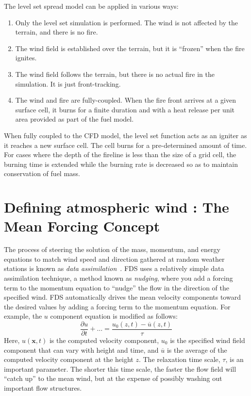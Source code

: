 \documentclass[journal,article,atmosphere,submit,moreauthors,pdftex]{Definitions/mdpi}
\begin{document}
The level set spread model can be applied in various ways:
\begin{enumerate}
\item Only the level set simulation is performed. The wind is not affected by the terrain, and there is no fire.
\item The wind field is established over the terrain, but it is ``frozen'' when the fire ignites.
\item The wind field follows the terrain, but there is no actual fire in the simulation. It is just front-tracking.
\item The wind and fire are fully-coupled. When the fire front arrives at a given surface cell, it burns for a finite duration and with a heat release per unit area provided as part of the fuel model.
\end{enumerate}
When fully coupled to the CFD model, the level set function acts as an igniter as it reaches a new surface cell. The cell burns for a pre-determined amount of time. For cases where the depth of the fireline is less than the size of a grid cell, the burning time is extended while the burning rate is decreased so as to maintain conservation of fuel mass.











\section{Defining atmospheric wind : The Mean Forcing Concept} \label{sec:wind}

The process of steering the solution of the mass, momentum, and energy equations to match wind speed and direction gathered at random weather stations is known as \emph{data assimilation}~\cite{Kalnay:2003}. FDS uses a relatively simple data assimilation technique, a method known as \emph{nudging}, where you add a forcing term to the momentum equation to ``nudge'' the flow in the direction of the specified wind. FDS automatically drives the mean velocity components toward the desired values by adding a forcing term to the momentum equation. For example, the $u$ component equation is modified as follows:
\begin{equation}
   \frac{\partial u}{\partial t} + \ldots = \frac{u_0(z,t)-\overline{u}(z,t)}{\tau} \label{mean_forcing_u}
\end{equation}
Here, $u(\mathbf{x},t)$ is the computed velocity component, $u_0$ is the specified wind field component that can vary with height and time, and $\overline{u}$ is the average of the computed velocity component at the height $z$. The relaxation time scale, $\tau$, is an important parameter. The shorter this time scale, the faster the flow field will ``catch up'' to the mean wind, but at the expense of possibly washing out important flow structures.
\end{document}
